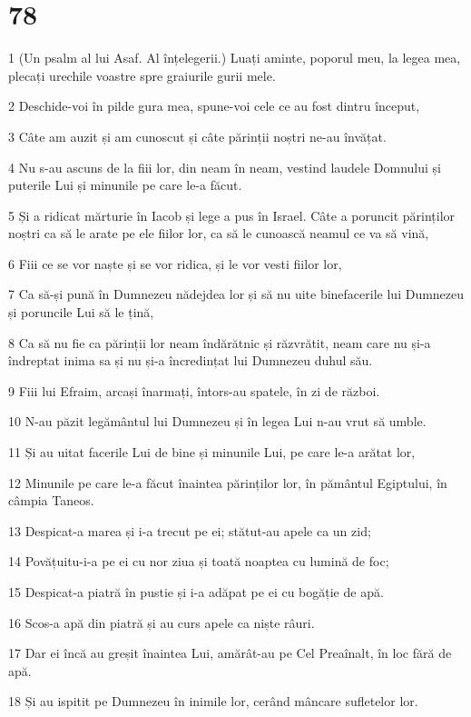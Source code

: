 \chapter{78}

\par 1 (Un psalm al lui Asaf. Al înțelegerii.) Luați aminte, poporul meu, la legea mea, plecați urechile voastre spre graiurile gurii mele.
\par 2 Deschide-voi în pilde gura mea, spune-voi cele ce au fost dintru început,
\par 3 Câte am auzit și am cunoscut și câte părinții noștri ne-au învățat.
\par 4 Nu s-au ascuns de la fiii lor, din neam în neam, vestind laudele Domnului și puterile Lui și minunile pe care le-a făcut.
\par 5 Și a ridicat mărturie în Iacob și lege a pus în Israel. Câte a poruncit părinților noștri ca să le arate pe ele fiilor lor, ca să le cunoască neamul ce va să vină,
\par 6 Fiii ce se vor naște și se vor ridica, și le vor vesti fiilor lor,
\par 7 Ca să-și pună în Dumnezeu nădejdea lor și să nu uite binefacerile lui Dumnezeu și poruncile Lui să le țină,
\par 8 Ca să nu fie ca părinții lor neam îndărătnic și răzvrătit, neam care nu și-a îndreptat inima sa și nu și-a încredințat lui Dumnezeu duhul său.
\par 9 Fiii lui Efraim, arcași înarmați, întors-au spatele, în zi de război.
\par 10 N-au păzit legământul lui Dumnezeu și în legea Lui n-au vrut să umble.
\par 11 Și au uitat facerile Lui de bine și minunile Lui, pe care le-a arătat lor,
\par 12 Minunile pe care le-a făcut înaintea părinților lor, în pământul Egiptului, în câmpia Taneos.
\par 13 Despicat-a marea și i-a trecut pe ei; stătut-au apele ca un zid;
\par 14 Povățuitu-i-a pe ei cu nor ziua și toată noaptea cu lumină de foc;
\par 15 Despicat-a piatră în pustie și i-a adăpat pe ei cu bogăție de apă.
\par 16 Scos-a apă din piatră și au curs apele ca niște râuri.
\par 17 Dar ei încă au greșit înaintea Lui, amărât-au pe Cel Preaînalt, în loc fără de apă.
\par 18 Și au ispitit pe Dumnezeu în inimile lor, cerând mâncare sufletelor lor.
